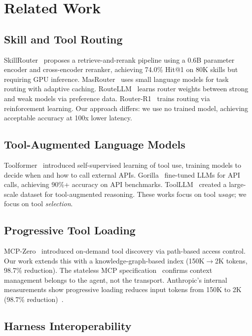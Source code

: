 \documentclass[11pt]{article}
\begin{document}
\section{Related Work}

\subsection{Skill and Tool Routing}

SkillRouter~\cite{skillrouter2026} proposes a retrieve-and-rerank pipeline using a 0.6B parameter encoder and cross-encoder reranker, achieving 74.0\% Hit@1 on 80K skills but requiring GPU inference. MasRouter~\cite{masrouter2025} uses small language models for task routing with adaptive caching. RouteLLM~\cite{routellm2025} learns router weights between strong and weak models via preference data. Router-R1~\cite{routerr12025} trains routing via reinforcement learning. Our approach differs: we use no trained model, achieving acceptable accuracy at 100x lower latency.

\subsection{Tool-Augmented Language Models}

Toolformer~\cite{toolformer2023} introduced self-supervised learning of tool use, training models to decide when and how to call external APIs. Gorilla~\cite{gorilla2023} fine-tuned LLMs for API calls, achieving 90\%+ accuracy on API benchmarks. ToolLLM~\cite{toolllm2024} created a large-scale dataset for tool-augmented reasoning. These works focus on tool \emph{usage}; we focus on tool \emph{selection}.

\subsection{Progressive Tool Loading}

MCP-Zero~\cite{mcpzero2025} introduced on-demand tool discovery via path-based access control. Our work extends this with a knowledge-graph-based index (150K$\to$2K tokens, 98.7\% reduction). The stateless MCP specification~\cite{mcp2026} confirms context management belongs to the agent, not the transport. Anthropic's internal measurements show progressive loading reduces input tokens from 150K to 2K (98.7\% reduction)~\cite{anthropic2025}.

\subsection{Harness Interoperability}
\end{document}
